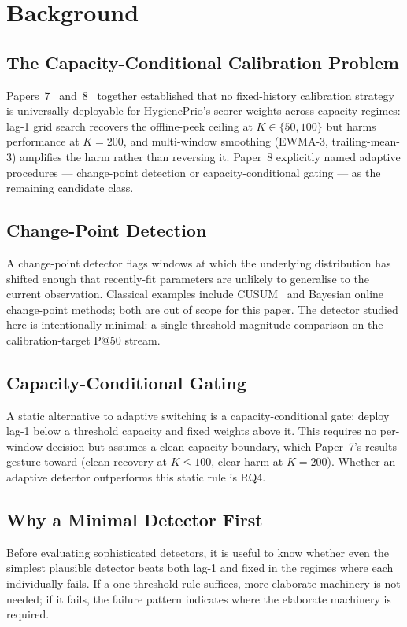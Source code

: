 \section{Background}

\subsection{The Capacity-Conditional Calibration Problem}

Papers~7~\cite{paper7online} and~8~\cite{paper8multi} together
established that no fixed-history calibration strategy is universally
deployable for HygienePrio's scorer weights across capacity regimes:
lag-1 grid search recovers the offline-peek ceiling at $K \in
\{50, 100\}$ but harms performance at $K = 200$, and multi-window
smoothing (EWMA-3, trailing-mean-3) amplifies the harm rather than
reversing it. Paper~8 explicitly named adaptive procedures ---
change-point detection or capacity-conditional gating --- as the
remaining candidate class.

\subsection{Change-Point Detection}

A change-point detector flags windows at which the underlying
distribution has shifted enough that recently-fit parameters are
unlikely to generalise to the current observation. Classical
examples include CUSUM~\cite{page1954cusum} and Bayesian online
change-point methods; both are out of scope for this paper. The
detector studied here is intentionally minimal: a single-threshold
magnitude comparison on the calibration-target P@50 stream.

\subsection{Capacity-Conditional Gating}

A static alternative to adaptive switching is a capacity-conditional
gate: deploy lag-1 below a threshold capacity and fixed weights above
it. This requires no per-window decision but assumes a clean
capacity-boundary, which Paper~7's results gesture toward (clean
recovery at $K \leq 100$, clear harm at $K = 200$). Whether an
adaptive detector outperforms this static rule is RQ4.

\subsection{Why a Minimal Detector First}

Before evaluating sophisticated detectors, it is useful to know whether
even the simplest plausible detector beats both lag-1 and fixed in
the regimes where each individually fails. If a one-threshold rule
suffices, more elaborate machinery is not needed; if it fails, the
failure pattern indicates where the elaborate machinery is required.
